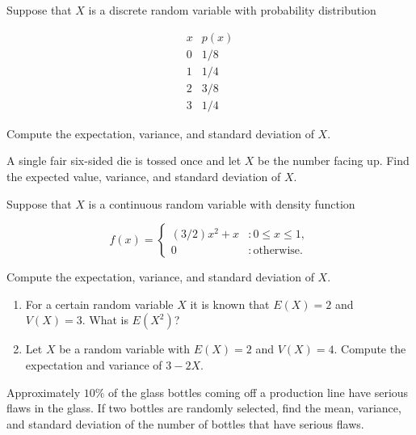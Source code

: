 \documentclass[12pt,reqno]{amsart}
\begin{document}
\newpage
\prob Suppose that $X$ is a discrete random variable with probability distribution

	\[
	\begin{array}{c|c}
	x & p(x) \\ \hline
	0 & 1/8   \\
	1 & 1/4   \\
	2 & 3/8  \\
	3 & 1/4 
	\end{array}
	\]

Compute the expectation, variance, and standard deviation of $X$.\vfill





















\bigskip
\prob A single fair six-sided die is tossed once and let $X$ be the number facing up. Find the expected value, variance, and standard deviation of $X$.\vfill





















\bigskip
\prob Suppose that $X$ is a continuous random variable with density function
	
	\[
	f(x) = \begin{cases}
	(3/2)x^2 + x & : 0\leq x \leq 1, \\
	0 & : \text{otherwise}.
	\end{cases}
	\]

Compute the expectation, variance, and standard deviation of $X$.\vfill














\newpage
\prob

\begin{enumerate}
\item For a certain random variable $X$ it is known that $E(X)=2$ and $V(X) = 3$. What is $E(X^2)$?\vfill
\item Let $X$ be a random variable with $E(X)=2$ and $V(X)=4$. Compute the expectation and variance of $3-2X$.\vfill
\end{enumerate}















\bigskip
\prob Approximately $10\%$ of the glass bottles coming off a production line have serious flaws in the glass. If two bottles are randomly selected, find the mean, variance, and standard deviation of the number of bottles that have serious flaws.\vfill
\end{document}
